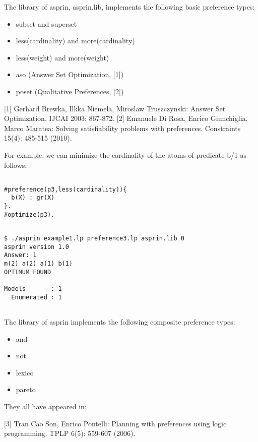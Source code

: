  The library of asprin, asprin.lib, implements the following basic preference types:  
\begin{itemize}
	\item  subset and superset   
	\item  less(cardinality) and more(cardinality)   
	\item  less(weight) and more(weight)   
	\item  aso   (Answer Set Optimization, [1])   
	\item  poset (Qualitative Preferences, [2])  
\end{itemize}

 [1] Gerhard Brewka, Ilkka Niemela, Miroslaw Truszczynski: Answer Set Optimization. IJCAI 2003: 867-872. 
 [2] Emanuele Di Rosa, Enrico Giunchiglia, Marco Maratea: Solving satisfiability problems with preferences. Constraints 15(4): 485-515 (2010). 

 For example, we can minimize the cardinality of the atoms of predicate b/1 as follows: 
\begin{verbatim}

#preference(p3,less(cardinality)){                                                                                             
  b(X) : gr(X)                                                                                                    
}.
#optimize(p3).
\end{verbatim}
\begin{verbatim}

$ ./asprin example1.lp preference3.lp asprin.lib 0
asprin version 1.0
Answer: 1
m(2) a(2) a(1) b(1)
OPTIMUM FOUND

Models       : 1
  Enumerated : 1
  
\end{verbatim}

 The library of asprin implements the following composite preference types:  
\begin{itemize}
	\item  and   
	\item  not    
	\item  lexico   
	\item  pareto  
\end{itemize}

They all have appeared in:

 [3] Tran Cao Son, Enrico Pontelli: Planning with preferences using logic programming. TPLP 6(5): 559-607 (2006). 

